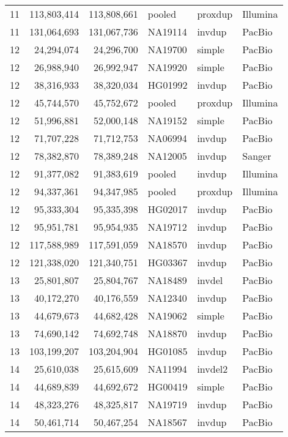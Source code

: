 {\begin{tiny}
\begin{longtable}{rrrlll}
    11  & 113,803,414 & 113,808,661 & pooled  & proxdup & Illumina  \\
    11  & 131,064,693 & 131,067,736 & NA19114 & invdup  & PacBio  \\
    12  & 24,294,074  & 24,296,700  & NA19700 & simple  & PacBio  \\
    12  & 26,988,940  & 26,992,947  & NA19920 & simple  & PacBio  \\
    12  & 38,316,933  & 38,320,034  & HG01992 & invdup  & PacBio  \\
    12  & 45,744,570  & 45,752,672  & pooled  & proxdup & Illumina  \\
    12  & 51,996,881  & 52,000,148  & NA19152 & simple  & PacBio  \\
    12  & 71,707,228  & 71,712,753  & NA06994 & invdup  & PacBio  \\
    12  & 78,382,870  & 78,389,248  & NA12005 & invdup  & Sanger  \\
    12  & 91,377,082  & 91,383,619  & pooled  & invdup  & Illumina  \\
    12  & 94,337,361  & 94,347,985  & pooled  & proxdup & Illumina  \\
    12  & 95,333,304  & 95,335,398  & HG02017 & invdup  & PacBio  \\
    12  & 95,951,781  & 95,954,935  & NA19712 & invdup  & PacBio  \\
    12  & 117,588,989 & 117,591,059 & NA18570 & invdup  & PacBio  \\
    12  & 121,338,020 & 121,340,751 & HG03367 & invdup  & PacBio  \\
    13  & 25,801,807  & 25,804,767  & NA18489 & invdel  & PacBio  \\
    13  & 40,172,270  & 40,176,559  & NA12340 & invdup  & PacBio  \\
    13  & 44,679,673  & 44,682,428  & NA19062 & simple  & PacBio  \\
    13  & 74,690,142  & 74,692,748  & NA18870 & invdup  & PacBio  \\
    13  & 103,199,207 & 103,204,904 & HG01085 & invdup  & PacBio  \\
    14  & 25,610,038  & 25,615,609  & NA11994 & invdel2 & PacBio  \\
    14  & 44,689,839  & 44,692,672  & HG00419 & simple  & PacBio  \\
    14  & 48,323,276  & 48,325,817  & NA19719 & invdup  & PacBio  \\
    14  & 50,461,714  & 50,467,254  & NA18567 & invdup  & PacBio  \\

\end{longtable}
\end{tiny}}

